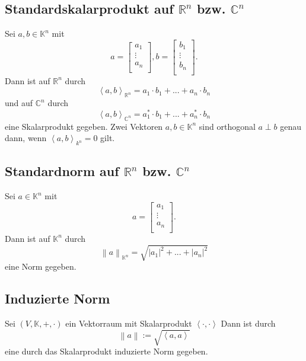 \subsection{Standardskalarprodukt auf $\mathbb{R}^n$ bzw. $\mathbb{C}^n$}
Sei $a,b \in \mathbb{K}^n$ mit
\begin{displaymath}
    a=
    \begin{bmatrix}
        a_1 \\
        \vdots \\
        a_n \\
    \end{bmatrix}
    ,
    b=
    \begin{bmatrix}
        b_1 \\
        \vdots \\
        b_n \\
    \end{bmatrix}
    .
\end{displaymath}
Dann ist auf $\mathbb{R}^n$ durch
\begin{displaymath}
    \left< a,b \right>_{\mathbb{R}^n} = a_1 \cdot b_1 + ... + a_n \cdot b_n
\end{displaymath}
und auf $\mathbb{C}^n$ durch
\begin{displaymath}
    \left< a,b \right>_{\mathbb{C}^n} = a_1^* \cdot b_1 + ... + a_n^* \cdot b_n
\end{displaymath}
eine Skalarprodukt gegeben. Zwei Vektoren $a,b \in \mathbb{K}^n$ sind orthogonal $a \perp b$ genau dann, wenn $\left< a,b \right>_{k^n} = 0$ gilt.

\subsection{Standardnorm auf $\mathbb{R}^n$ bzw. $\mathbb{C}^n$}
Sei $a \in \mathbb{K}^n $ mit
\begin{displaymath}
    a = 
    \begin{bmatrix}
        a_1 \\
        \vdots \\
        a_n \\
    \end{bmatrix}
    .
\end{displaymath}
Dann ist auf $\mathbb{K}^n$ durch 
\begin{displaymath}
    \left\| a \right\|_{\mathbb{K}^n} = \sqrt{\left| a_1 \right|^2 + ... + \left| a_n \right|^2} 
\end{displaymath}
eine Norm gegeben.
\subsection{Induzierte Norm}
Sei $(V,\mathbb{K},+,\cdot)$ ein Vektorraum mit Skalarprodukt $\left< \cdot , \cdot \right>$ Dann ist durch
\begin{displaymath}
    \left\| a \right\| := \sqrt{\left< a , a \right>}
\end{displaymath}
eine durch das Skalarprodukt induzierte Norm gegeben.

